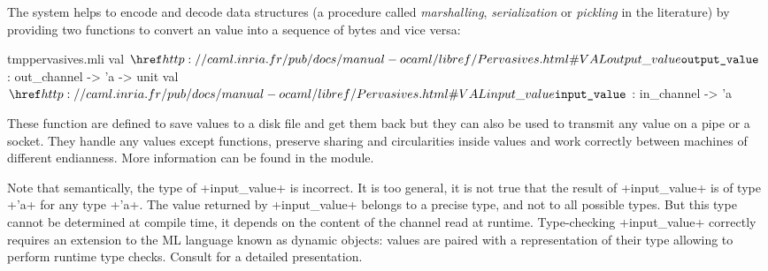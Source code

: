 The {\ocaml} system helps to encode and decode data structures (a
procedure called
\emph{marshalling}, \emph{serialization} or \emph{pickling} in the
literature) by providing two functions to convert an {\ocaml} value
into a sequence of bytes and vice versa:
%
\begin{listingcodefile}{tmppervasives.mli}
val $\indexlibvalue{Pervasives}{output\_value}$ : out_channel -> 'a -> unit
val $\indexlibvalue{Pervasives}{input\_value}$ : in_channel -> 'a
\end{listingcodefile}
% 
These function are defined to save values to a disk file and get
them back but they can also be used to transmit any value on a pipe or
a socket. They handle any {\ocaml} values except functions, preserve
sharing and circularities inside values and work correctly between
machines of different endianness. More information can be found in the
 module.

Note that semantically, the type of \ml+input_value+ is incorrect. It
is too general, it is not true that the result of \ml+input_value+ is
of type \ml+'a+ for any type \ml+'a+. The value returned by
\ml+input_value+ belongs to a precise type, and not to all possible
types. But this type cannot be determined at compile time, it depends
on the content of the channel read at runtime. Type-checking
\ml+input_value+ correctly requires an extension to the ML language
known as dynamic objects: values are paired with a representation of
their type allowing to perform runtime type checks. Consult
\cite{Dynamiques} for a detailed presentation.



